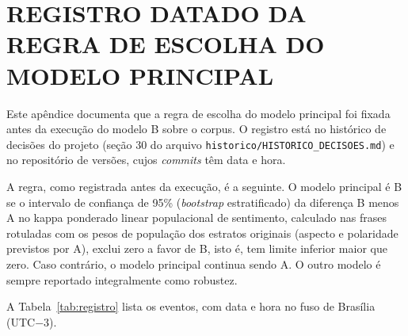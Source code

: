 \appendix

\section{REGISTRO DATADO DA REGRA DE ESCOLHA DO MODELO PRINCIPAL}

Este apêndice documenta que a regra de escolha do modelo principal foi fixada antes da execução do modelo B sobre o corpus. O registro está no histórico de decisões do projeto (seção 30 do arquivo \texttt{historico/HISTORICO\_DECISOES.md}) e no repositório de versões, cujos \textit{commits} têm data e hora.

A regra, como registrada antes da execução, é a seguinte. O modelo principal é B se o intervalo de confiança de 95\% (\textit{bootstrap} estratificado) da diferença B menos A no kappa ponderado linear populacional de sentimento, calculado nas frases rotuladas com os pesos de população dos estratos originais (aspecto e polaridade previstos por A), exclui zero a favor de B, isto é, tem limite inferior maior que zero. Caso contrário, o modelo principal continua sendo A. O outro modelo é sempre reportado integralmente como robustez.

A Tabela~\ref{tab:registro} lista os eventos, com data e hora no fuso de Brasília (UTC$-3$).

\begin{table}[htb]
\centering
\caption{Sequência datada do registro da regra e da execução do modelo B.}
\small
{}
\label{tab:registro}
\end{table}

